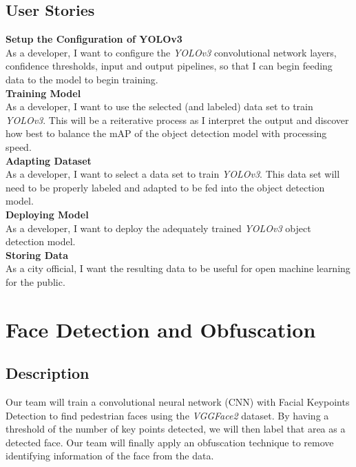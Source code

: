 \documentclass[onecolumn, draftclsnofoot,10pt, compsoc]{IEEEtran}
\begin{document}
\subsection{User Stories}
\textbf{Setup the Configuration of YOLOv3}
\\
As a developer, I want to configure the \textit{YOLOv3} convolutional network layers, confidence thresholds, input and output pipelines, so that I can begin feeding data to the model to begin training.
\\
\textbf{Training Model}
\\
As a developer, I want to use the selected (and labeled) data set to train \textit{YOLOv3}. This will be a reiterative process as I interpret the output and discover how best to balance the mAP of the object detection model with processing speed.
\\
\textbf{Adapting Dataset}
\\
As a developer, I want to select a data set to train \textit{YOLOv3}. This data set will need to be properly labeled and adapted to be fed into the object detection model.
\\
\textbf{Deploying Model}
\\
As a developer, I want to deploy the adequately trained \textit{YOLOv3} object detection model.
\\
\textbf{Storing Data}
\\
As a city official, I want the resulting data to be useful for open machine learning for the public. 


\section{Face Detection and Obfuscation}
\subsection{Description}
Our team will train a convolutional neural network (CNN) with Facial Keypoints Detection to find pedestrian faces using the \textit{VGGFace2} dataset. By having a threshold of the number of key points detected, we will then label that area as a detected face. Our team will finally apply an obfuscation technique to remove identifying information of the face from the data.
\end{document}

